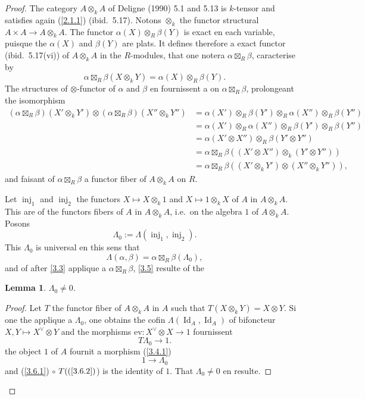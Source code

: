 \documentclass[11pt,a4paper]{article}
\theoremstyle{plain}
\newtheorem{lemma}[theorem]{Lemma}
\theoremstyle{definition}
\DeclareMathOperator{\Id}{Id}
\newcommand{\ev}{\mathrm{ev}}
\newcommand{\inj}{\operatorname{inj}}
\begin{document}
\begin{proof}
The category $A\otimes_k A$ of Deligne (1990) 5.1 and 5.13 is $k$-tensor and satisfies again (\ref{2.1.1}) (ibid.~5.17). Notons $\otimes_k$ the functor structural $A\times A\to A\otimes_k A$. The functor $\alpha(X)\otimes_R\beta(Y)$ is exact en each variable, puisque the $\alpha(X)$ and $\beta(Y)$ are plats. It defines therefore a exact functor (ibid.~5.17(vi)) of $A\otimes_k A$ in the $R$-modules, that one notera $\alpha\boxtimes_R\beta$, caracterise by
\[
\alpha\boxtimes_R\beta(X\otimes_k Y)=\alpha(X)\otimes_R\beta(Y).
\]
The structures of $\otimes$-functor of $\alpha$ and $\beta$ en fournissent a on $\alpha\boxtimes_R\beta$, prolongeant the isomorphism
\begin{align*}
(\alpha\boxtimes_R\beta)(X'\otimes_k Y')\otimes(\alpha\boxtimes_R\beta)(X''\otimes_k Y'') &= \alpha(X')\otimes_R\beta(Y')\otimes_R\alpha(X'')\otimes_R\beta(Y'')\\
&=\alpha(X')\otimes_R\alpha(X'')\otimes_R\beta(Y')\otimes_R\beta(Y'')\\
&=\alpha(X'\otimes X'')\otimes_R\beta(Y'\otimes Y'')\\
&=\alpha\boxtimes_R\beta((X'\otimes X'')\otimes_k(Y'\otimes Y''))\\
&=\alpha\boxtimes_R\beta((X'\otimes_k Y')\otimes(X''\otimes_k Y'')),
\end{align*}
and faisant of $\alpha\boxtimes_R\beta$ a functor fiber of $A\otimes_k A$ on $R$.

Let $\inj_1$ and $\inj_2$ the functors $X\mapsto X\otimes_k1$ and $X\mapsto1\otimes_k X$ of $A$ in $A\otimes_k A$. This are of the functors fibers of $A$ in $A\otimes_k A$, i.e.~on the algebra $1$ of $A\otimes_k A$. Posons
\begin{equation}\label{3.5.1}
\Lambda_0:=\Lambda(\inj_1,\inj_2).
\end{equation}
This $\Lambda_0$ is universal en this sens that
\[
\Lambda(\alpha,\beta)=\alpha\boxtimes_R\beta(\Lambda_0),
\]
and of after \ref{3.3} applique a $\alpha\boxtimes_R\beta$, \ref{3.5} resulte of the

\begin{lemma}\label{3.6}
$\Lambda_0\neq0$.
\end{lemma}

\begin{proof}
Let $T$ the functor fiber of $A\otimes_k A$ in $A$ such that $T(X\otimes_k Y)=X\otimes Y$. Si one the applique a $\Lambda_0$, one obtains the cofin $\Lambda(\Id_A,\Id_A)$ of bifoncteur $X,Y\mapsto X^\vee\otimes Y$ and the morphisms $\ev:X^\vee\otimes X\to1$ fournissent
\begin{equation}\label{3.6.1}
T\Lambda_0\to1.
\end{equation}
the object $1$ of $A$ fournit a morphism (\ref{3.4.1})
\begin{equation}\label{3.6.2}
1\to\Lambda_0
\end{equation}
and (\ref{3.6.1}) $\circ$ $T((\ref{3.6.2})$) is the identity of $1$. That $\Lambda_0\neq0$ en resulte.
\end{proof}
\let\qed\relax
\end{proof}
\end{document}

